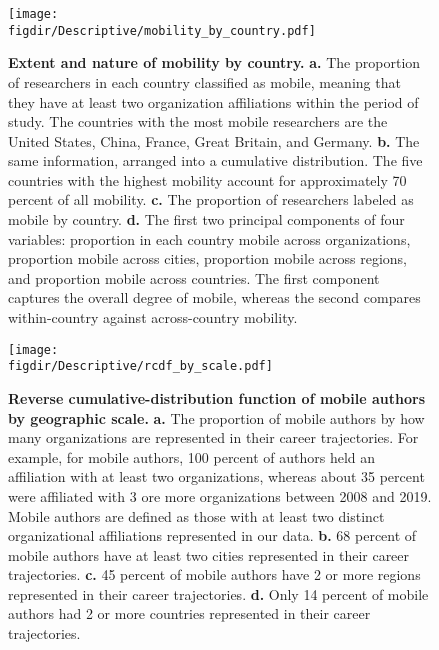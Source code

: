\documentclass[12pt]{article} %
\def\figdir{../Figs}
\begin{document}
%
%
\begin{figure}[p!]
    \centering
    \label{fig:supp:pubs_over_time}
    \texttt{[image: \\figdir/Descriptive/mobility\_by\_country.pdf]}
    \caption{
        \textbf{Extent and nature of mobility by country.}
        \textbf{a.}
        The proportion of researchers in each country classified as mobile, meaning that they have at least two organization affiliations within the period of study.
        The countries with the most mobile researchers are the United States, China, France, Great Britain, and Germany.
        \textbf{b.}
        The same information, arranged into a cumulative distribution.
        The five countries with the highest mobility account for approximately 70 percent of all mobility.
        \textbf{c.} The proportion of researchers labeled as mobile by country.
        \textbf{d.} The first two principal components of four variables: proportion in each country mobile across organizations, proportion mobile across cities, proportion mobile across regions, and proportion mobile across countries.
        The first component captures the overall degree of mobile, whereas the second compares within-country against across-country mobility.
    }
\end{figure}


\newpage
%
%
\begin{figure}[p!]
    \centering
    \label{fig:supp:rcdf_by_scale}
    \texttt{[image: \\figdir/Descriptive/rcdf\_by\_scale.pdf]}
    \caption{
        \textbf{Reverse cumulative-distribution function of mobile authors by geographic scale.}
        \textbf{a.}
        The proportion of mobile authors by how many organizations are represented in their career trajectories.
        For example, for mobile authors, 100 percent of authors held an affiliation with at least two organizations, whereas about 35 percent were affiliated with 3 ore more organizations between 2008 and 2019.
        Mobile authors are defined as those with at least two distinct organizational affiliations represented in our data.
        \textbf{b.} 68 percent of mobile authors have at least two cities represented in their career trajectories.
        \textbf{c.} 45 percent of mobile authors have 2 or more regions represented in their career trajectories.
        \textbf{d.} Only 14 percent of mobile authors had 2 or more countries represented in their career trajectories.
    }
\end{figure}
\end{document}
